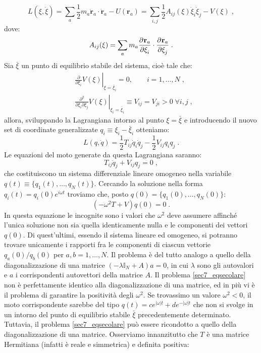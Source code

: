 \begin{equation}
L(\xi,\dot{\xi})=\sum_a\frac{1}{2}m_a\dot{\mathbf{r}}_a\cdot\dot{\mathbf{r}}_a-U(\mathbf{r}_a)=\sum_{i,j}\frac{1}{2}A_{ij}(\xi)\dot{\xi}_i\dot{\xi}_j-V(\xi)\;,
\end{equation}
dove:
\begin{equation}
A_{ij}(\xi)=\sum_a m_a\frac{\partial^{}\mathbf{r}_a}{\partial \xi_i^{}}\cdot\frac{\partial^{}\mathbf{r}_a}{\partial \xi_j^{}}\;.
\end{equation}
Sia $\bar{\xi}$ un punto di equilibrio stabile del sistema, cioè tale che:
\begin{align}
&\left.\frac{\partial}{\partial\xi_i}V(\xi)\right|_{\xi=\bar{\xi}_i}=0,\qquad i=1,\ldots, N\;, \\
&\left.\frac{\partial^2}{\partial\xi_i\partial\xi_j}V(\xi)\right|_{\xi_i=\bar{\xi}_i}\equiv V_{ij}=V_{ji}>0\; \forall i,j\;,
\end{align}
allora, sviluppando la Lagrangiana intorno al punto $\xi=\bar{\xi}$ e introducendo il nuovo set di coordinate generalizzate $q_i\equiv \xi_i-\bar{\xi}_i$ otteniamo:
\begin{equation}
L(q,\dot{q})=\frac{1}{2}T_{ij}\dot{q}_i\dot{q}_j-\frac{1}{2}V_{ij}q_iq_j\;.
\end{equation}
Le equazioni del moto generate da questa Lagrangiana saranno:
\begin{equation}
T_{ij}\ddot{q}_j+V_{ij}q_j=0\;,
\end{equation}
che costituiscono un sistema differenziale lineare omogeneo nella variabile $q(t)\equiv\{q_1(t),\ldots,q_N(t)\}$. Cercando la soluzione nella forma $q_i(t)=q_i(0)e^{i\omega t}$ troviamo che, posto $q(0)=\{q_1(0),\ldots,q_N(0)\}$:
\begin{equation}
(-\omega^2T+V)q(0)=0\;. \label{sec7_eqsecolare}
\end{equation}
In questa equazione le incognite sono i valori che $\omega^2$ deve assumere affinché l'unica soluzione non sia quella identicamente nulla e le componenti dei vettori $q(0)$. Di quest'ultimi, essendo il sistema lineare ed omogeneo, si potranno trovare unicamente i rapporti fra le componenti di ciascun vettorie $q_a(0)/q_b(0)$ per $a,b=1,\ldots, N$. Il problema è del tutto analogo a quello della diagonalizzazione di una matrice $(-\lambda \mathbb{I}_N+A)a=0$, in cui $\lambda$ sono gli autovalori e $a$ i corrispondenti autovettori della matrice $A$. Il problema \eqref{sec7_eqsecolare} non è perfettamente identico alla diagonalizzazione di una matrice, ed in più vi è il problema di garantire la positività degli $\omega^2$. Se trovassimo un valore $\omega^2<0$, il moto corrispondente sarebbe del tipo $q(t)=ce^{|\omega|t}+de^{-|\omega|t}$ che non si svolge in un intorno del punto di equilibrio stabile $\bar{\xi}$ precedentemente determinato. Tuttavia, il problema \eqref{sec7_eqsecolare} può essere ricondotto a quello della diagonalizzazione di una matrice. Osserviamo innanzitutto che $T$ è una matrice Hermitiana (infatti è reale e simmetrica) e definita positiva:
